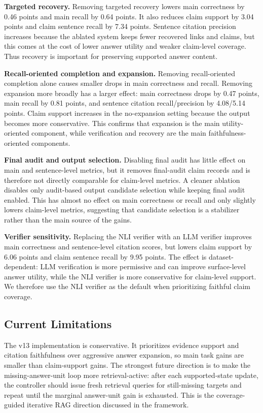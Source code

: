 \textbf{Targeted recovery.} Removing targeted recovery lowers main correctness by 0.46 points and main recall by 0.64 points. It also reduces claim support by 3.04 points and claim sentence recall by 7.34 points. Sentence citation precision increases because the ablated system keeps fewer recovered links and claims, but this comes at the cost of lower answer utility and weaker claim-level coverage. Thus recovery is important for preserving supported answer content.

\textbf{Recall-oriented completion and expansion.} Removing recall-oriented completion alone causes smaller drops in main correctness and recall. Removing expansion more broadly has a larger effect: main correctness drops by 0.47 points, main recall by 0.81 points, and sentence citation recall/precision by 4.08/5.14 points. Claim support increases in the no-expansion setting because the output becomes more conservative. This confirms that expansion is the main utility-oriented component, while verification and recovery are the main faithfulness-oriented components.

\textbf{Final audit and output selection.} Disabling final audit has little effect on main and sentence-level metrics, but it removes final-audit claim records and is therefore not directly comparable for claim-level metrics. A cleaner ablation disables only audit-based output candidate selection while keeping final audit enabled. This has almost no effect on main correctness or recall and only slightly lowers claim-level metrics, suggesting that candidate selection is a stabilizer rather than the main source of the gains.

\textbf{Verifier sensitivity.} Replacing the NLI verifier with an LLM verifier improves main correctness and sentence-level citation scores, but lowers claim support by 6.06 points and claim sentence recall by 9.95 points. The effect is dataset-dependent: LLM verification is more permissive and can improve surface-level answer utility, while the NLI verifier is more conservative for claim-level support. We therefore use the NLI verifier as the default when prioritizing faithful claim coverage.

\subsection{Current Limitations}

The v13 implementation is conservative. It prioritizes evidence support and citation faithfulness over aggressive answer expansion, so main task gains are smaller than claim-support gains. The strongest future direction is to make the missing-answer-unit loop more retrieval-active: after each supported-state update, the controller should issue fresh retrieval queries for still-missing targets and repeat until the marginal answer-unit gain is exhausted. This is the coverage-guided iterative RAG direction discussed in the framework.
